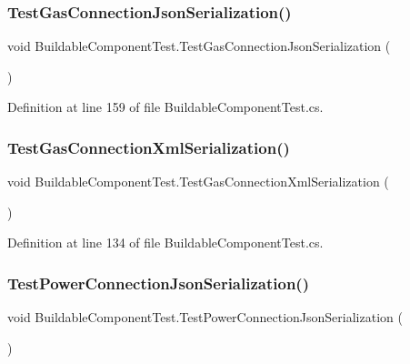 \subsubsection{\texorpdfstring{Test\+Gas\+Connection\+Json\+Serialization()}{TestGasConnectionJsonSerialization()}}
{\footnotesize\ttfamily void Buildable\+Component\+Test.\+Test\+Gas\+Connection\+Json\+Serialization (\begin{DoxyParamCaption}{ }\end{DoxyParamCaption})}



Definition at line 159 of file Buildable\+Component\+Test.\+cs.

\mbox{\label{class_buildable_component_test_aeb6b8929dc3fd6f78b7e81f3a6bcb299}} 
\subsubsection{\texorpdfstring{Test\+Gas\+Connection\+Xml\+Serialization()}{TestGasConnectionXmlSerialization()}}
{\footnotesize\ttfamily void Buildable\+Component\+Test.\+Test\+Gas\+Connection\+Xml\+Serialization (\begin{DoxyParamCaption}{ }\end{DoxyParamCaption})}



Definition at line 134 of file Buildable\+Component\+Test.\+cs.

\mbox{\label{class_buildable_component_test_ad5499ba48b08e30f835ab76cf6a9be94}} 
\subsubsection{\texorpdfstring{Test\+Power\+Connection\+Json\+Serialization()}{TestPowerConnectionJsonSerialization()}}
{\footnotesize\ttfamily void Buildable\+Component\+Test.\+Test\+Power\+Connection\+Json\+Serialization (\begin{DoxyParamCaption}{ }\end{DoxyParamCaption})}



